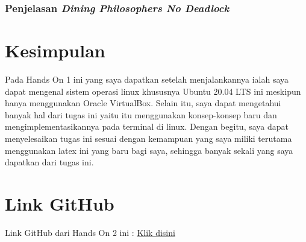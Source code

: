 \documentclass[11pt,a4paper]{article}
\begin{document}
\subsubsection{Penjelasan \textit{Dining Philosophers No Deadlock}}

\newpage
\section{Kesimpulan}
	Pada Hands On 1 ini yang saya dapatkan setelah menjalankannya ialah saya dapat mengenal sistem operasi linux
	khususnya Ubuntu 20.04 LTS ini meskipun hanya menggunakan Oracle VirtualBox. Selain itu, saya dapat mengetahui
	banyak hal dari tugas ini yaitu itu menggunakan konsep-konsep baru dan mengimplementasikannya pada terminal di linux.
	Dengan begitu, saya dapat menyelesaikan tugas ini sesuai dengan kemampuan yang saya miliki terutama menggunakan latex
	ini yang baru bagi saya, sehingga banyak sekali yang saya dapatkan dari tugas ini.
		
\section{Link GitHub}
	Link GitHub dari Hands On 2 ini : \href{https://github.com/BilhaqAD07/Sistem-Operasi.git}{Klik disini}


\newpage


\end{document}
